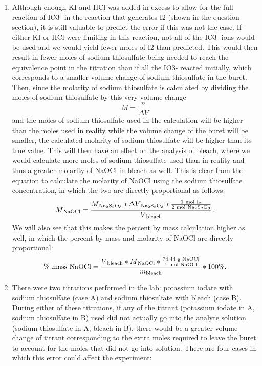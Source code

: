 \documentclass[11pt]{article} %
\begin{document}
\begin{enumerate}
	\item Although enough KI and HCl was added in excess to allow for the full reaction of IO3- in the reaction that generates I2 (shown in the question section), it is still valuable to predict the error if this was not the case. If either KI or HCl were limiting in this reaction, not all of the IO3- ions would be used and we would yield fewer moles of I2 than predicted. This would then result in fewer moles of sodium thiosulfate being needed to reach the equivalence point in the titration than if all the IO3- reacted initially, which corresponds to a smaller volume change of sodium thiosulfate in the buret. Then, since the molarity of sodium thiosulfate is calculated by dividing the moles of sodium thiosulfate by this very volume change $$M = \frac{n}{\Delta V}$$ and the moles of sodium thiosulfate used in the calculation will be higher than the moles used in reality while the volume change of the buret will be smaller, the calculated molarity of sodium thiosulfate will be higher than its true value. This will then have an effect on the analysis of bleach, where we would calculate more moles of sodium thiosulfate used than in reality and thus a greater molarity of NaOCl in bleach as well. This is clear from the equation to calculate the molarity of NaOCl using the sodium thiosulfate concentration, in which the two are directly proportional as follows:
$$M\textsubscript{NaOCl} = \frac{M\textsubscript{Na\textsubscript{2}S\textsubscript{2}O\textsubscript{3}} * \Delta V\textsubscript{Na\textsubscript{2}S\textsubscript{2}O\textsubscript{3}} * \frac{\textrm{1 mol I\textsubscript{2}}}{\textrm{2 mol Na\textsubscript{2}S\textsubscript{2}O\textsubscript{3}}}}{V\textsubscript{bleach}}.$$
We will also see that this makes the percent by mass calculation higher as well, in which the percent by mass and molarity of NaOCl are directly proportional:
$$\textrm{\% mass NaOCl} = \frac{V\textsubscript{bleach} * M\textsubscript{NaOCl} * \frac{\textrm{74.44 g NaOCl}}{\textrm{1 mol NaOCl}}}{m\textsubscript{bleach}} * 100\%.$$
	\item There were two titrations performed in the lab: potassium iodate with sodium thiosulfate (case A) and sodium thiosulfate with bleach (case B). During either of these titrations, if any of the titrant (potassium iodate in A, sodium thiosulfate in B) used did not actually go into the analyte solution (sodium thiosulfate in A, bleach in B), there would be a greater volume change of titrant corresponding to the extra moles required to leave the buret to account for the moles that did not go into solution. There are four cases in which this error could affect the experiment:

\end{enumerate}
\end{document}
